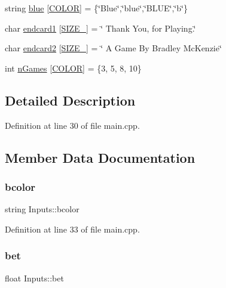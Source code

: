 \begin{DoxyCompactItemize}
string \hyperlink{struct_inputs_a685a6f5b41c965ecc2ff5ede529649da}{blue} \mbox{[}\hyperlink{main_8cpp_aa6d8034c897057de595a4511a4e7a837}{C\+O\+L\+OR}\mbox{]} = \{\char`\"{}Blue\char`\"{},\char`\"{}blue\char`\"{},\char`\"{}B\+L\+UE\char`\"{},\char`\"{}b\char`\"{}\}
\item 
char \hyperlink{struct_inputs_aeaa5f5939511046bc20580b4f9ffb4af}{endcard1} \mbox{[}\hyperlink{main_8cpp_a449535d4215a26529b13febc509c199c}{S\+I\+Z\+E\+\_}\mbox{]} = \char`\"{} Thank You, for Playing.\char`\"{}
\item 
char \hyperlink{struct_inputs_a1b0aa4e5a7bbc8c59633477ab06b90ec}{endcard2} \mbox{[}\hyperlink{main_8cpp_aef76f3385c12d0d696e38d02a917359f}{S\+I\+Z\+E\+\_}\mbox{]} = \char`\"{} A Game By Bradley Mc\+Kenzie\char`\"{}
\item 
int \hyperlink{struct_inputs_a8b7271740a32d3d765130231e98dee68}{n\+Games} \mbox{[}\hyperlink{main_8cpp_aa6d8034c897057de595a4511a4e7a837}{C\+O\+L\+OR}\mbox{]} = \{3, 5, 8, 10\}
\end{DoxyCompactItemize}


\subsection{Detailed Description}


Definition at line 30 of file main.\+cpp.



\subsection{Member Data Documentation}
\mbox{\label{struct_inputs_a7a35f3dd65cc7f24cd3e4940bd36fa74}} 
\subsubsection{\texorpdfstring{bcolor}{bcolor}}
{\footnotesize\ttfamily string Inputs\+::bcolor}



Definition at line 33 of file main.\+cpp.

\mbox{\label{struct_inputs_af2dd0562ce671279d010f1f6c927e719}} 
\subsubsection{\texorpdfstring{bet}{bet}}
{\footnotesize\ttfamily float Inputs\+::bet}



